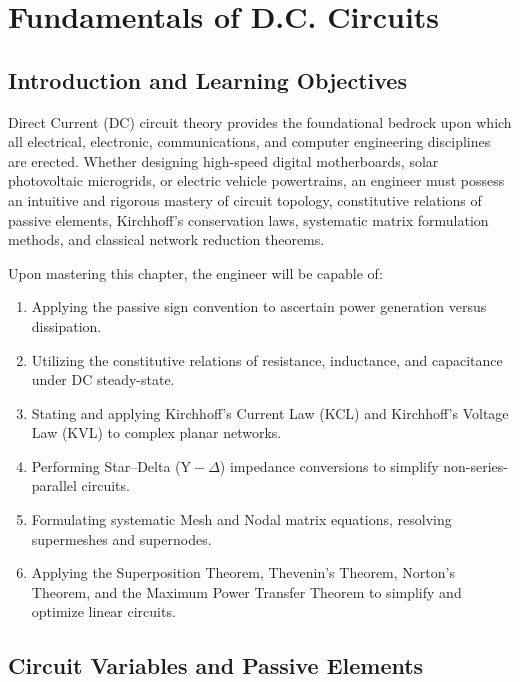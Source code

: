 \chapter{Fundamentals of D.C. Circuits}
\label{chap:dc-circuits}

\section{Introduction and Learning Objectives}
Direct Current (DC) circuit theory provides the foundational bedrock upon which all electrical, electronic, communications, and computer engineering disciplines are erected. Whether designing high-speed digital motherboards, solar photovoltaic microgrids, or electric vehicle powertrains, an engineer must possess an intuitive and rigorous mastery of circuit topology, constitutive relations of passive elements, Kirchhoff's conservation laws, systematic matrix formulation methods, and classical network reduction theorems.

\begin{important}
Upon mastering this chapter, the engineer will be capable of:
\begin{enumerate}[leftmargin=1.5em]
    \item Applying the passive sign convention to ascertain power generation versus dissipation.
    \item Utilizing the constitutive relations of resistance, inductance, and capacitance under DC steady-state.
    \item Stating and applying Kirchhoff's Current Law (KCL) and Kirchhoff's Voltage Law (KVL) to complex planar networks.
    \item Performing Star--Delta ($\text{Y}-\Delta$) impedance conversions to simplify non-series-parallel circuits.
    \item Formulating systematic Mesh and Nodal matrix equations, resolving supermeshes and supernodes.
    \item Applying the Superposition Theorem, Thevenin's Theorem, Norton's Theorem, and the Maximum Power Transfer Theorem to simplify and optimize linear circuits.
\end{enumerate}
\end{important}

\section{Circuit Variables and Passive Elements}

